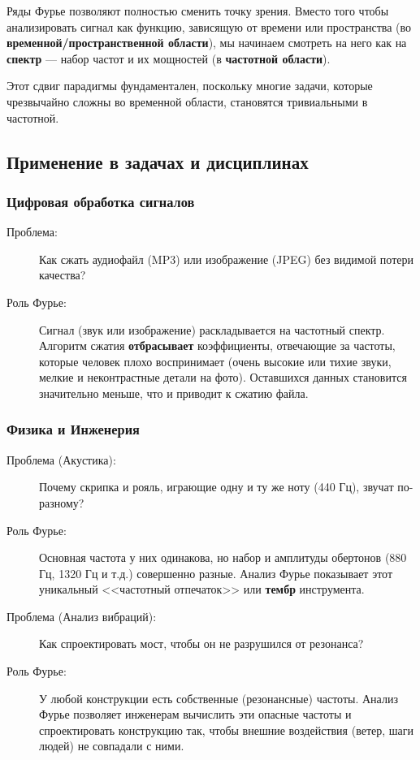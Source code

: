 \documentclass[a4paper, 12pt]{report}
\numberwithin{equation}{section}
\begin{document}
Ряды Фурье позволяют полностью сменить точку зрения. Вместо того чтобы анализировать сигнал как функцию, зависящую от времени или пространства (во \textbf{временной/пространственной области}), мы начинаем смотреть на него как на \textbf{спектр} — набор частот и их мощностей (в \textbf{частотной области}).

Этот сдвиг парадигмы фундаментален, поскольку многие задачи, которые чрезвычайно сложны во временной области, становятся тривиальными в частотной.

\subsection{Применение в задачах и дисциплинах}

\subsubsection{Цифровая обработка сигналов}
\begin{description}
	\item[Проблема:] Как сжать аудиофайл (MP3) или изображение (JPEG) без видимой потери качества?
	\item[Роль Фурье:] Сигнал (звук или изображение) раскладывается на частотный спектр. Алгоритм сжатия \textbf{отбрасывает} коэффициенты, отвечающие за частоты, которые человек плохо воспринимает (очень высокие или тихие звуки, мелкие и неконтрастные детали на фото). Оставшихся данных становится значительно меньше, что и приводит к сжатию файла.
\end{description}

\subsubsection{Физика и Инженерия}
\begin{description}
	\item[Проблема (Акустика):] Почему скрипка и рояль, играющие одну и ту же ноту (440 Гц), звучат по-разному?
	\item[Роль Фурье:] Основная частота у них одинакова, но набор и амплитуды обертонов (880 Гц, 1320 Гц и т.д.) совершенно разные. Анализ Фурье показывает этот уникальный <<частотный отпечаток>> или \textbf{тембр} инструмента.
	
	\item[Проблема (Анализ вибраций):] Как спроектировать мост, чтобы он не разрушился от резонанса?
	\item[Роль Фурье:] У любой конструкции есть собственные (резонансные) частоты. Анализ Фурье позволяет инженерам вычислить эти опасные частоты и спроектировать конструкцию так, чтобы внешние воздействия (ветер, шаги людей) не совпадали с ними.
\end{description}
\end{document}
